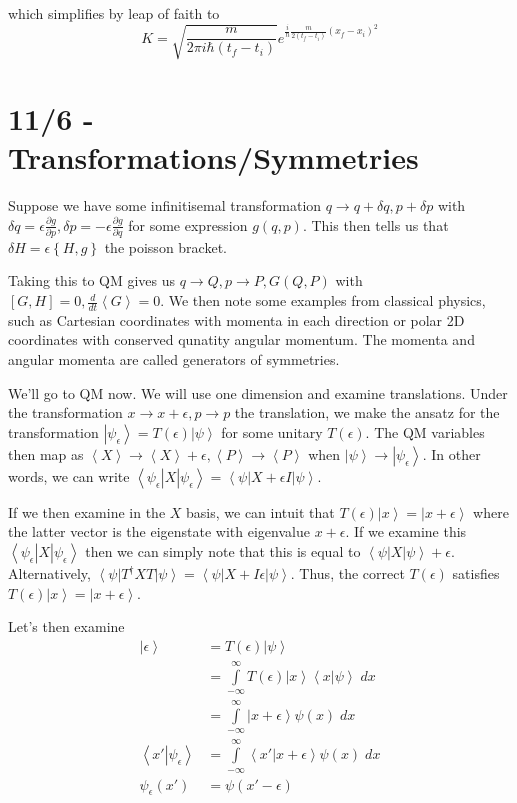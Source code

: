 \documentclass[10pt]{report}
\newcommand{\bra}[1]{\left<#1\right|}
\newcommand{\ket}[1]{\left|#1\right>}
\newcommand{\dotp}[2]{\left<#1\left.\right|#2\right>}
\newcommand{\rd}[2]{\frac{d#1}{d#2}}
\newcommand{\pd}[2]{\frac{\partial #1}{\partial#2}}
\newcommand{\expvalue}[1]{\left<#1\right>}
\begin{document}
which simplifies by leap of faith to
$$K = \sqrt{\frac{m}{2\pi i \hbar (t_f - t_i)}}e^{\frac{i}{\hbar}\frac{m}{2(t_f - t_i)}(x_f - x_i)^2}$$
\chapter{11/6 - Transformations/Symmetries}

Suppose we have some infinitisemal transformation $q \to q + \delta q, p  + \delta p$ with $\delta q = \epsilon \pd{g}{p}, \delta p = -\epsilon \pd{g}{q}$ for some expression $g(q,p)$. This then tells us that $\delta H = \epsilon \left\{ H,g \right\}$ the poisson bracket.

Taking this to QM gives us $q \to Q, p \to P, G(Q,P)$ with $\left[ G,H \right] = 0, \rd{}{t}\expvalue{G} = 0$. We then note some examples from classical physics, such as Cartesian coordinates with momenta in each direction or polar 2D coordinates with conserved qunatity angular momentum. The momenta and angular momenta are called generators of symmetries.

We'll go to QM now. We will use one dimension and examine translations. Under the transformation $x \to x + \epsilon, p \to p$ the translation, we make the ansatz for the transformation $\ket{\psi_\epsilon} = T(\epsilon)\ket{\psi}$ for some unitary $T(\epsilon)$.  The QM variables then map as $\expvalue{X} \to \expvalue{X} + \epsilon, \expvalue{P} \to \expvalue{P}$ when $\ket{\psi} \to \ket{\psi_\epsilon}$. In other words, we can write $\bra{\psi_\epsilon}X\ket{\psi_\epsilon} = \bra{\psi}X + \epsilon I\ket{\psi}$. 

If we then examine in the $X$ basis, we can intuit that $T(\epsilon) \ket{x} = \ket{x + \epsilon}$ where the latter vector is the eigenstate with eigenvalue $x + \epsilon$. If we examine this $\bra{\psi_\epsilon}X\ket{\psi_\epsilon}$ then we can simply note that this is equal to $\bra{\psi}X\ket{\psi} + \epsilon$. Alternatively, $\bra{\psi}T^\dagger X T \ket{\psi} = \bra{\psi}X + I\epsilon \ket{\psi}$. Thus, the correct $T(\epsilon)$ satisfies $T(\epsilon) \ket{x} = \ket{x+\epsilon}$. 

Let's then examine
\begin{align}
	\ket{\epsilon} &= T(\epsilon)\ket{\psi}\\
	&= \displaystyle\int\limits_{-\infty}^{\infty}T(\epsilon) \ket{x}\dotp{x}{\psi}\;dx\\
	&= \displaystyle\int\limits_{-\infty}^{\infty}\ket{x+\epsilon}\psi(x)\;dx\\
	\dotp{x'}{\psi_\epsilon} &= \displaystyle\int\limits_{-\infty}^{\infty}\dotp{x'}{x + \epsilon}\psi(x)\;dx\\
	\psi_\epsilon(x') &= \psi(x'-\epsilon)
\end{align}
\end{document}
